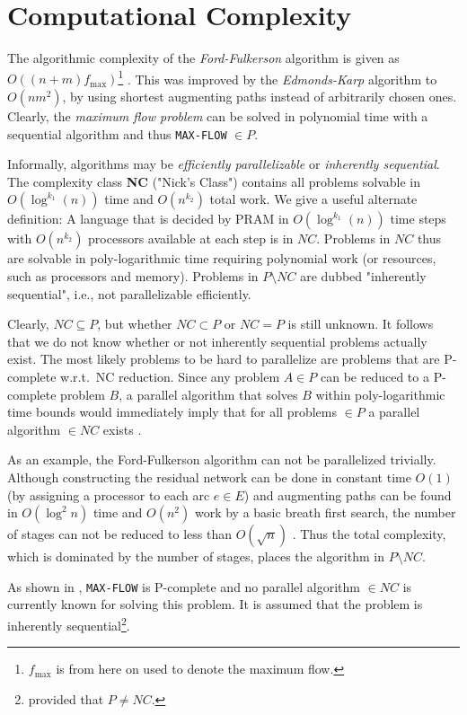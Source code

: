 \documentclass[a4paper,10pt, twocolumn]{article}
\begin{document}
\section{Computational Complexity}
\label{sec:cc}
The algorithmic complexity of the \emph{Ford-Fulkerson} algorithm is given as $O((n+m)f_{\mathrm{max}})$\footnote{$f_{\mathrm{max}}$ is from here on used to denote the maximum flow.} \cite{ahuja93,papa95}. This was improved by the \emph{Edmonds-Karp} algorithm to $O(nm^2)$, by using shortest augmenting paths instead of arbitrarily chosen ones. Clearly, the \emph{maximum flow problem} can be solved in polynomial time with a sequential algorithm and thus \lstinline|MAX-FLOW| $\in P$.

Informally, algorithms may be \emph{efficiently parallelizable} or \emph{inherently sequential}. The complexity class \textbf{NC} \cite{papa95} ("Nick's Class") contains all problems solvable in $O(\log^{k_1}(n))$ time and $O(n^{k_2})$ total work. We give a useful alternate definition:  A language that is decided by PRAM in $O(\log^{k_1}(n))$ time steps with $O(n^{k_2})$ processors available at each step is in $NC$. Problems in $NC$ thus are solvable  in poly-logarithmic time requiring polynomial work (or resources, such as processors and memory). Problems in $P \setminus NC$ are dubbed "inherently sequential", i.e., not parallelizable efficiently. 

Clearly, $NC \subseteq P$, but whether $NC \subset P$ or $NC = P$ is still unknown. It follows that we do not know whether or not inherently sequential problems actually exist. The most likely problems to be hard to parallelize are problems that are P-complete w.r.t.\ NC reduction. Since any problem $A \in P$ can be reduced to a P-complete problem $B$, a parallel algorithm that solves $B$ within poly-logarithmic time bounds would immediately imply that for all problems $\in P$ a parallel algorithm $\in NC$ exists \cite{papa95}.

As an example, the Ford-Fulkerson algorithm can not be parallelized trivially. Although constructing the residual network can be done in constant time $O(1)$ (by assigning a processor to each arc $e \in E$) and augmenting paths can be found in $O(\log^{2}n)$ time and $O(n^{2})$ work by a basic breath first search, the number of stages can not be reduced to less than $O(\sqrt{n})$ \cite{ahuja93}. Thus the total complexity, which is dominated by the number of stages, places the algorithm in $P \setminus NC$.
	
As shown in \cite{papa95}, \lstinline|MAX-FLOW| is P-complete and no parallel algorithm $\in NC$ is currently known for solving this problem. It is assumed that the problem is inherently sequential\footnote{provided that $P \neq NC$.}.
\end{document}
